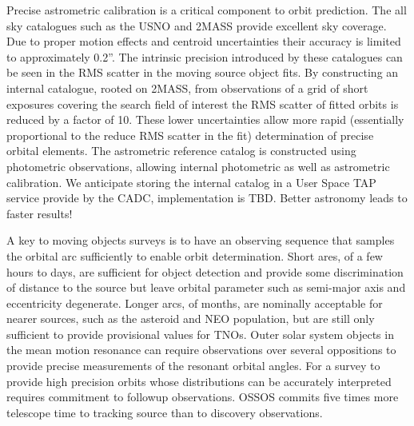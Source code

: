 Precise astrometric calibration is a critical component to orbit prediction. The all sky catalogues such as the USNO and 2MASS provide excellent sky coverage. Due to proper motion effects and centroid uncertainties their accuracy  is limited to approximately 0.2''. The intrinsic precision introduced by these catalogues can be seen in the RMS scatter in the moving source object fits. By constructing an internal catalogue, rooted on 2MASS, from observations of a grid of short exposures covering the search field of interest the RMS scatter of fitted orbits is reduced by a factor of 10. These lower uncertainties allow more rapid (essentially proportional to the reduce RMS scatter in the fit) determination of precise orbital elements. The astrometric reference catalog is constructed using photometric observations, allowing internal photometric as well as astrometric calibration. We anticipate storing the internal catalog in a User Space TAP service provide by the CADC, implementation is TBD. Better astronomy leads to faster results!


A key to moving objects surveys is to have an observing sequence that samples the orbital arc sufficiently to enable orbit determination. Short ares, of a few hours to days, are sufficient for object detection and provide some discrimination of distance to the source but leave orbital parameter such as semi-major axis and eccentricity degenerate. Longer arcs, of months, are nominally acceptable for nearer sources, such as the asteroid and NEO population, but are still only sufficient to provide provisional values for TNOs. Outer solar system objects in the mean motion resonance can require observations over several oppositions to provide precise measurements of the resonant orbital angles. For a survey to provide high precision orbits whose distributions can be accurately interpreted requires commitment to followup observations. OSSOS commits five times more telescope time to tracking source than to discovery observations. 


